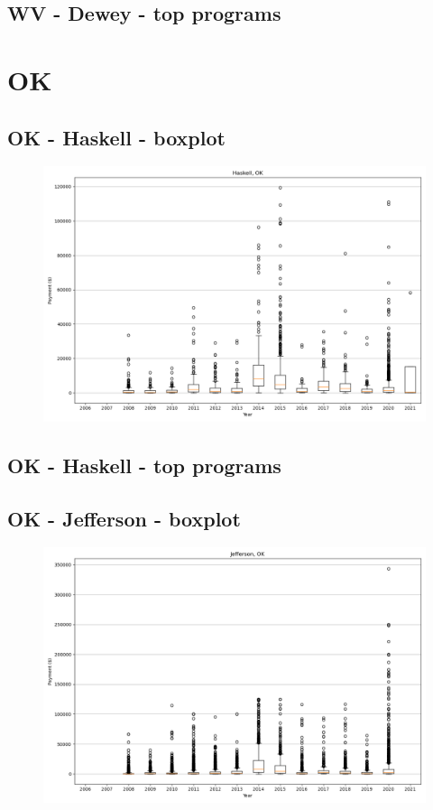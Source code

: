\subsection*{WV - Dewey - top programs}

\newpage
\section*{OK}
\subsection*{OK - Haskell - boxplot}
\begin{figure}[h]
\centering
\includegraphics[width=7in]{../output/boxplots/counties/Haskell-OK_boxplot.png}
\end{figure}


\subsection*{OK - Haskell - top programs}

\newpage
\subsection*{OK - Jefferson - boxplot}
\begin{figure}[h]
\centering
\includegraphics[width=7in]{../output/boxplots/counties/Jefferson-OK_boxplot.png}
\end{figure}


